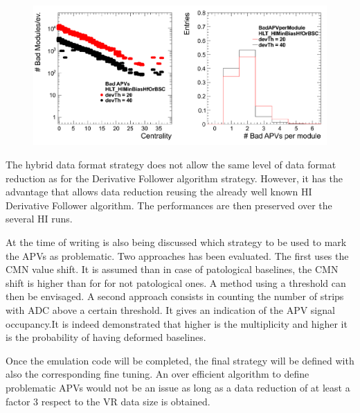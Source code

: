     
\begin{figure}[htbp]
\begin{center}
\includegraphics[width=.80\textwidth]{figures/BadAPV.pdf}
\caption{}
\label{fig:stripBadAPV}
\end{center}
\end{figure}

The hybrid data format strategy does not allow the same level of data format reduction as for the Derivative Follower algorithm strategy. However, it has the advantage that allows data reduction reusing the already well known HI Derivative Follower algorithm. The performances are then preserved over the several HI runs. 

At the time of writing is also being discussed which strategy to be used to mark the APVs as problematic. Two approaches has been evaluated. The first uses the CMN value shift. It is assumed than in case of patological baselines, the CMN shift is higher than for for not patological ones. A method using a threshold can then be envisaged. A second approach consists in counting the number of strips with ADC above a certain threshold. It gives an indication of the APV signal occupancy.It is indeed demonstrated that higher is the multiplicity and higher it is the probability of having deformed baselines. 

Once the emulation code will be completed, the final strategy will be defined with also the corresponding fine tuning. An over efficient algorithm to define problematic APVs would not be an issue as long as a data reduction of at least a factor 3 respect to the VR data size is obtained. 

